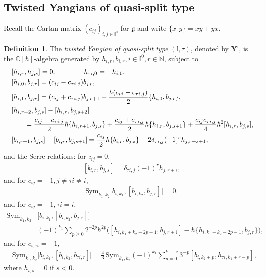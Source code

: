 \documentclass[11pt,reqno]{amsart}
\numberwithin{equation}{section}
\theoremstyle{definition}
\newtheorem{dfn}[thm]{Definition}
\theoremstyle{remark}
\newcommand{\beq}{\begin{equation}}
\newcommand{\eeq}{\end{equation}}
\newcommand{\g}{\mathfrak{g}}
\newcommand{\gge}{\geqslant}
\newcommand{\Yi}{{\mathbf{Y}^\imath}}
\def \h{\hbar}
\def \H{h}
\def \X{b}
\def \I{\mathbb{I}}
\def \N{\mathbb{N}}
\begin{document}
\subsection{Twisted Yangians of quasi-split type}
Recall the Cartan matrix $(c_{ij})_{i,j\in\I^0}$ for $\g$ and write $\{x,y\}=xy+yx$.
\begin{dfn}\label{deftY}
The \emph{twisted Yangian of quasi-split type} $(\I,\tau)$, denoted by $\Yi$, is the $\mathbb{C}[\h]$-algebra generated by $\H_{i,r},\X_{i,r},i\in \mathbb{I}^0,r\in \N$, subject to
\begin{align}\label{qsconj0}
&\quad [\H_{i,r},\H_{j,s}]=0,\qquad\qquad  h_{\tau i,0}=-h_{i,0},
\\\label{qsconj5'}
&\quad [\H_{i,0},\X_{j,r}]=  (c_{ij}-c_{\tau i,j}) \X_{j,r},
\\\label{qsconj5}
&\quad [\H_{i,1},\X_{j,r}]=  (c_{ij}+c_{\tau i,j}) \X_{j,r+1}+\frac{\h(c_{ij}-c_{\tau i,j})}{2}\{\H_{i,0},\X_{j,r}\},
\\\notag
&\quad [\H_{i,r+2},\X_{j,s}] - [\H_{i,r},\X_{j,s+2}]
\\\label{qsconj2}
&\hskip 1cm =\frac{c_{ij}-c_{\tau i,j}}{2}\h\{\H_{i,r+1},\X_{j,s}\}+\frac{c_{ij}+c_{\tau i,j}}{2}\h\{\H_{i,r},\X_{j,s+1}\}+\frac{c_{ij}c_{\tau i,j}}{4}\h^2[\H_{i,r}, \X_{j,s}],
\\\label{qsconj3}
&\quad [\X_{i,r+1 },\X_{j,s}]  - [\X_{i,r },\X_{j,s+1 }] 
 =\frac{c_{ij}}{2}\h\{\X_{i,r },\X_{j,s }\}-2 \delta_{\tau i,j}(-1)^{r}\H_{j,r+s+1 },
\end{align}
and the Serre relations: for $c_{ij}=0,$
\begin{align}\label{qsconj4}
&[\X_{i,r},\X_{j,s}]= \delta_{\tau i,j}(-1)^{r}h_{j,r+s},
\end{align}
and for $c_{ij}=-1,j\neq \tau i\neq i$,
\begin{align}\label{qsconj9}
&\mathrm{Sym}_{k_1,k_2}\big[b_{i,k_1},[b_{i,k_2},b_{j,r}] \big] =0,
\end{align}
and for $c_{ij}=-1,\tau i=i$,
\beq\label{qsconj8}
\begin{split}
\mathrm{Sym}_{k_1,k_2}&\big[b_{i,k_1},[b_{i,k_2},b_{j,r}] \big] \\
=\,&(-1)^{k_1}\sum_{p\gge 0}2^{-2p}\h^{2p}\big([h_{i,k_1+k_2-2p-1},b_{j,r+1}]-\h\{h_{i,k_1+k_2-2p-1},b_{j,r}\}\big),
\end{split}
\eeq
and for $c_{i,\tau i}=-1$,
\begin{align}\label{qsconj10}
&\mathrm{Sym}_{k_1,k_2}\big[b_{i,k_1},[b_{i,k_2},b_{\tau i,r}] \big] =\frac{4}{3}\,\mathrm{Sym}_{k_1,k_2}(-1)^{k_1}\sum_{p=0}^{k_1+r}3^{-p}[b_{i,k_2+p},h_{\tau i,k_1+r-p}],
\end{align}
where $\H_{i,s}=0$ if $s< 0$.
\end{dfn}
\end{document}
